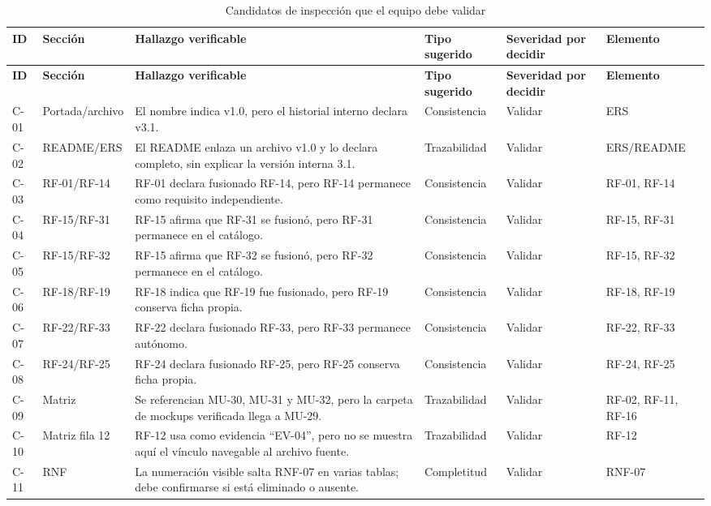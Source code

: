 \documentclass[11pt,a4paper]{article}
\begin{document}
	\begin{longtable}{p{0.8cm}p{2.0cm}p{4.5cm}p{2.1cm}p{1.6cm}p{2.3cm}}
		\caption{Candidatos de inspección que el equipo debe validar}\label{tab:candidatos}\\
		\toprule
		\textbf{ID} & \textbf{Sección} & \textbf{Hallazgo verificable} & \textbf{Tipo sugerido} & \textbf{Severidad por decidir} & \textbf{Elemento}\\
		\midrule\endfirsthead
		\toprule
		\textbf{ID} & \textbf{Sección} & \textbf{Hallazgo verificable} & \textbf{Tipo sugerido} & \textbf{Severidad por decidir} & \textbf{Elemento}\\
		\midrule\endhead
		C-01 & Portada/archivo & El nombre indica v1.0, pero el historial interno declara v3.1. & Consistencia & Validar & ERS\\
		C-02 & README/ERS & El README enlaza un archivo v1.0 y lo declara completo, sin explicar la versión interna 3.1. & Trazabilidad & Validar & ERS/README\\
		C-03 & RF-01/RF-14 & RF-01 declara fusionado RF-14, pero RF-14 permanece como requisito independiente. & Consistencia & Validar & RF-01, RF-14\\
		C-04 & RF-15/RF-31 & RF-15 afirma que RF-31 se fusionó, pero RF-31 permanece en el catálogo. & Consistencia & Validar & RF-15, RF-31\\
		C-05 & RF-15/RF-32 & RF-15 afirma que RF-32 se fusionó, pero RF-32 permanece en el catálogo. & Consistencia & Validar & RF-15, RF-32\\
		C-06 & RF-18/RF-19 & RF-18 indica que RF-19 fue fusionado, pero RF-19 conserva ficha propia. & Consistencia & Validar & RF-18, RF-19\\
		C-07 & RF-22/RF-33 & RF-22 declara fusionado RF-33, pero RF-33 permanece autónomo. & Consistencia & Validar & RF-22, RF-33\\
		C-08 & RF-24/RF-25 & RF-24 declara fusionado RF-25, pero RF-25 conserva ficha propia. & Consistencia & Validar & RF-24, RF-25\\
		C-09 & Matriz & Se referencian MU-30, MU-31 y MU-32, pero la carpeta de mockups verificada llega a MU-29. & Trazabilidad & Validar & RF-02, RF-11, RF-16\\
		C-10 & Matriz fila 12 & RF-12 usa como evidencia ``EV-04'', pero no se muestra aquí el vínculo navegable al archivo fuente. & Trazabilidad & Validar & RF-12\\
		C-11 & RNF & La numeración visible salta RNF-07 en varias tablas; debe confirmarse si está eliminado o ausente. & Completitud & Validar & RNF-07\\

\end{longtable}
\end{document}
